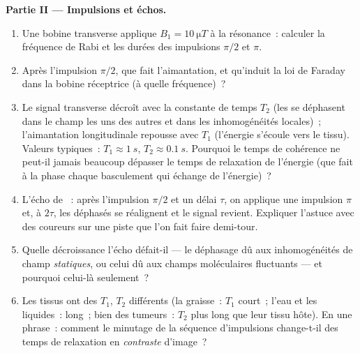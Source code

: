 \begin{problem}
\medskip\noindent\textbf{Partie II --- Impulsions et échos.}
\begin{enumerate}[resume]
  \item Une bobine transverse applique $B_1 = \qty{10}{\micro T}$ à
        la résonance~: calculer la fréquence de Rabi et les durées
        des impulsions $\pi/2$ et $\pi$.
  \item Après l'impulsion $\pi/2$, que fait l'aimantation, et
        qu'induit la loi de Faraday dans la bobine réceptrice (à
        quelle fréquence)~?
  \item Le signal transverse décroît avec la constante de temps $T_2$
        (les  se déphasent dans le champ les uns des autres et
        dans les inhomogénéités locales)~; l'aimantation
        longitudinale repousse avec $T_1$ (l'énergie s'écoule vers le
        tissu). Valeurs typiques~: $T_1 \approx \qty{1}{s}$,
        $T_2 \approx \qty{0.1}{s}$. Pourquoi le temps de cohérence
        ne peut-il jamais beaucoup dépasser le temps de relaxation
        de l'énergie (que fait à la phase chaque basculement qui
        échange de l'énergie)~?
  \item L'écho de ~: après l'impulsion $\pi/2$ et un délai
        $\tau$, on applique une impulsion $\pi$ et, à $2\tau$, les
         déphasés se réalignent et le signal revient. Expliquer
        l'astuce avec des coureurs sur une piste que l'on fait faire
        demi-tour.
  \item Quelle décroissance l'écho défait-il --- le déphasage dû aux
        inhomogénéités de champ \emph{statiques}, ou celui dû aux
        champs moléculaires fluctuants --- et pourquoi celui-là
        seulement~?
  \item Les tissus ont des $T_1$, $T_2$ différents (la graisse~:
        $T_1$ court~; l'eau et les liquides~: long~; bien des
        tumeurs~: $T_2$ plus long que leur tissu hôte). En une
        phrase~: comment le minutage de la séquence d'impulsions
        change-t-il des temps de relaxation en \emph{contraste}
        d'image~?
\end{enumerate}


\end{problem}
